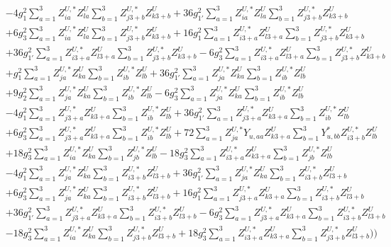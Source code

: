 \begin{align}
 &-4 g_{1}^{2} \sum_{a=1}^{3}Z^{U,*}_{i a} Z_{{l a}}^{U}  \sum_{b=1}^{3}Z^{U,*}_{j 3 + b} Z_{{k 3 + b}}^{U}  +36 g_{1'}^{2} \sum_{a=1}^{3}Z^{U,*}_{i a} Z_{{l a}}^{U}  \sum_{b=1}^{3}Z^{U,*}_{j 3 + b} Z_{{k 3 + b}}^{U}  \nonumber \\ 
 &+6 g_{3}^{2} \sum_{a=1}^{3}Z^{U,*}_{i a} Z_{{l a}}^{U}  \sum_{b=1}^{3}Z^{U,*}_{j 3 + b} Z_{{k 3 + b}}^{U}  +16 g_{1}^{2} \sum_{a=1}^{3}Z^{U,*}_{i 3 + a} Z_{{l 3 + a}}^{U}  \sum_{b=1}^{3}Z^{U,*}_{j 3 + b} Z_{{k 3 + b}}^{U}  \nonumber \\ 
 &+36 g_{1'}^{2} \sum_{a=1}^{3}Z^{U,*}_{i 3 + a} Z_{{l 3 + a}}^{U}  \sum_{b=1}^{3}Z^{U,*}_{j 3 + b} Z_{{k 3 + b}}^{U}  -6 g_{3}^{2} \sum_{a=1}^{3}Z^{U,*}_{i 3 + a} Z_{{l 3 + a}}^{U}  \sum_{b=1}^{3}Z^{U,*}_{j 3 + b} Z_{{k 3 + b}}^{U}  \nonumber \\ 
 &+g_{1}^{2} \sum_{a=1}^{3}Z^{U,*}_{j a} Z_{{k a}}^{U}  \sum_{b=1}^{3}Z^{U,*}_{i b} Z_{{l b}}^{U}  +36 g_{1'}^{2} \sum_{a=1}^{3}Z^{U,*}_{j a} Z_{{k a}}^{U}  \sum_{b=1}^{3}Z^{U,*}_{i b} Z_{{l b}}^{U}  \nonumber \\ 
 &+9 g_{2}^{2} \sum_{a=1}^{3}Z^{U,*}_{j a} Z_{{k a}}^{U}  \sum_{b=1}^{3}Z^{U,*}_{i b} Z_{{l b}}^{U}  -6 g_{3}^{2} \sum_{a=1}^{3}Z^{U,*}_{j a} Z_{{k a}}^{U}  \sum_{b=1}^{3}Z^{U,*}_{i b} Z_{{l b}}^{U}  \nonumber \\ 
 &-4 g_{1}^{2} \sum_{a=1}^{3}Z^{U,*}_{j 3 + a} Z_{{k 3 + a}}^{U}  \sum_{b=1}^{3}Z^{U,*}_{i b} Z_{{l b}}^{U}  +36 g_{1'}^{2} \sum_{a=1}^{3}Z^{U,*}_{j 3 + a} Z_{{k 3 + a}}^{U}  \sum_{b=1}^{3}Z^{U,*}_{i b} Z_{{l b}}^{U}  \nonumber \\ 
 &+6 g_{3}^{2} \sum_{a=1}^{3}Z^{U,*}_{j 3 + a} Z_{{k 3 + a}}^{U}  \sum_{b=1}^{3}Z^{U,*}_{i b} Z_{{l b}}^{U}  +72 \sum_{a=1}^{3}Z^{U,*}_{j a} Y_{u,{a a}} Z_{{k 3 + a}}^{U}  \sum_{b=1}^{3}Y^*_{u,{b b}} Z^{U,*}_{i 3 + b} Z_{{l b}}^{U}  \nonumber \\ 
 &+18 g_{3}^{2} \sum_{a=1}^{3}Z^{U,*}_{i a} Z_{{k a}}^{U}  \sum_{b=1}^{3}Z^{U,*}_{j b} Z_{{l b}}^{U}  -18 g_{3}^{2} \sum_{a=1}^{3}Z^{U,*}_{i 3 + a} Z_{{k 3 + a}}^{U}  \sum_{b=1}^{3}Z^{U,*}_{j b} Z_{{l b}}^{U}  \nonumber \\ 
 &-4 g_{1}^{2} \sum_{a=1}^{3}Z^{U,*}_{j a} Z_{{k a}}^{U}  \sum_{b=1}^{3}Z^{U,*}_{i 3 + b} Z_{{l 3 + b}}^{U}  +36 g_{1'}^{2} \sum_{a=1}^{3}Z^{U,*}_{j a} Z_{{k a}}^{U}  \sum_{b=1}^{3}Z^{U,*}_{i 3 + b} Z_{{l 3 + b}}^{U}  \nonumber \\ 
 &+6 g_{3}^{2} \sum_{a=1}^{3}Z^{U,*}_{j a} Z_{{k a}}^{U}  \sum_{b=1}^{3}Z^{U,*}_{i 3 + b} Z_{{l 3 + b}}^{U}  +16 g_{1}^{2} \sum_{a=1}^{3}Z^{U,*}_{j 3 + a} Z_{{k 3 + a}}^{U}  \sum_{b=1}^{3}Z^{U,*}_{i 3 + b} Z_{{l 3 + b}}^{U}  \nonumber \\ 
 &+36 g_{1'}^{2} \sum_{a=1}^{3}Z^{U,*}_{j 3 + a} Z_{{k 3 + a}}^{U}  \sum_{b=1}^{3}Z^{U,*}_{i 3 + b} Z_{{l 3 + b}}^{U}  -6 g_{3}^{2} \sum_{a=1}^{3}Z^{U,*}_{j 3 + a} Z_{{k 3 + a}}^{U}  \sum_{b=1}^{3}Z^{U,*}_{i 3 + b} Z_{{l 3 + b}}^{U}  \nonumber \\ 
 &-18 g_{3}^{2} \sum_{a=1}^{3}Z^{U,*}_{i a} Z_{{k a}}^{U}  \sum_{b=1}^{3}Z^{U,*}_{j 3 + b} Z_{{l 3 + b}}^{U}  +18 g_{3}^{2} \sum_{a=1}^{3}Z^{U,*}_{i 3 + a} Z_{{k 3 + a}}^{U}  \sum_{b=1}^{3}Z^{U,*}_{j 3 + b} Z_{{l 3 + b}}^{U}  \Big)\Big)\end{align} 
